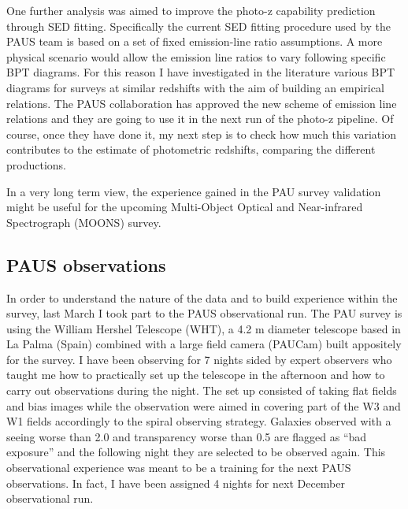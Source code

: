 \documentclass[letterpaper]{article}
\begin{document}
One further analysis was aimed to improve the photo-z capability prediction through SED fitting. Specifically the current SED fitting procedure used by the PAUS team is based on a set of fixed emission-line ratio assumptions. A more physical scenario would allow the emission line ratios to vary following specific BPT diagrams. For this reason I have investigated in the literature various BPT diagrams for surveys at similar redshifts with the aim of building an empirical relations. The PAUS collaboration has approved the new scheme of emission line relations and they are going to use it in the next run of the photo-z pipeline. Of course, once they have done it, my next step is to check how much this variation contributes to the estimate of photometric redshifts, comparing the different productions.

In a very long term view, the experience gained in the PAU survey validation might be useful for the upcoming Multi-Object Optical and Near-infrared Spectrograph (MOONS) survey.


\subsection{PAUS observations}
\label{sub:PAU_obs}
In order to understand the nature of the data and to build experience within the survey, last March I took part to the PAUS observational run. The PAU survey is using the William Hershel Telescope (WHT), a 4.2 m diameter telescope based in La Palma (Spain) combined with a large field camera (PAUCam) built appositely for the survey. I have been observing for 7 nights sided by expert observers who taught me how to practically set up the telescope in the afternoon and how to carry out observations during the night. The set up consisted of taking flat fields and bias images while the observation were aimed in covering part of the W3 and W1 fields accordingly to the spiral observing strategy. Galaxies observed with a seeing worse than 2.0 and transparency worse than 0.5 are flagged as ``bad exposure'' and the following night they are selected to be observed again. This observational experience was meant to be a training for the next PAUS observations. In fact, I have been assigned 4 nights for next December observational run.  
\end{document}
